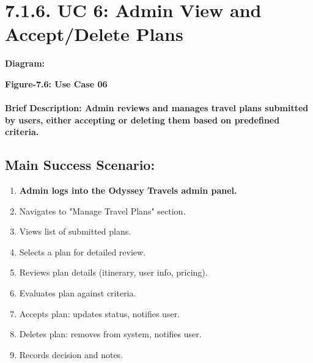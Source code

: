 \documentclass{scrreprt}
\begin{document}
\section*{\textbf{7.1.6. UC 6: Admin View and Accept/Delete Plans}}
\textbf{Diagram:}
\newline
\newline

\begin{center}
    \parbox{0.8\textwidth}{ 
        \centering
       
    }
\end{center}
\begin{center}
    \parbox{0.8\textwidth}{ 
        \centering
        \textbf{Figure-7.6: Use Case 06}
    }
\end{center}

\paragraph {\textnormal{Brief Description: 
Admin reviews and manages travel plans submitted by users, either accepting or deleting them based on predefined criteria.}}


\subsection*{\textbf{Main Success Scenario:}}

\begin{enumerate}
    \item \textbf{Admin logs into the Odyssey Travels admin panel.}
    \item Navigates to "Manage Travel Plans" section.
    \item Views list of submitted plans.
    \item Selects a plan for detailed review.
    \item Reviews plan details (itinerary, user info, pricing).
    \item Evaluates plan against criteria.
    \item Accepts plan: updates status, notifies user.
    \item Deletes plan: removes from system, notifies user.
    \item Records decision and notes.
\end{enumerate}
\end{document}
